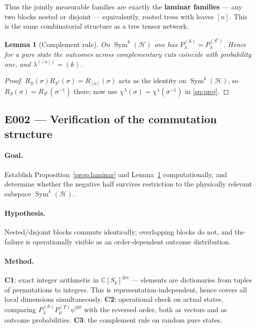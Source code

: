 \documentclass[11pt]{article}
\newtheorem{lemma}[theorem]{Lemma}
\theoremstyle{definition}
\theoremstyle{remark}
\newcommand{\Sym}{\operatorname{Sym}}
\newcommand{\Cx}{\mathbb{C}}
\newcommand{\Hil}{\mathcal{H}}
\begin{document}
Thus the jointly measurable families are exactly the \textbf{laminar families} --- any
two blocks nested or disjoint --- equivalently, rooted trees with leaves $[n]$. This is
the same combinatorial structure as a tree tensor network.

\begin{lemma}[Complement rule]
\label{lem:complement}
On $\Sym^k(\Hil)$ one has $P^{(S)}_\lambda = P^{(S^c)}_\lambda$. Hence for a pure state
the outcomes across complementary cuts coincide with probability one, and
$\lambda^{([n])} = (k)$.
\end{lemma}

\begin{proof}
$R_S(\sigma)R_{S^c}(\sigma) = R_{[n]}(\sigma)$ acts as the identity on $\Sym^k(\Hil)$,
so $R_S(\sigma) = R_{S^c}(\sigma^{-1})$ there; now use
$\chi^\lambda(\sigma) = \chi^\lambda(\sigma^{-1})$ in \eqref{eq:proj}.
\end{proof}

\subsection{E002 --- Verification of the commutation structure}

\paragraph{Goal.} Establish Proposition~\ref{prop:laminar} and Lemma~\ref{lem:complement}
computationally, and determine whether the negative half survives restriction to the
physically relevant subspace $\Sym^k(\Hil)$.

\paragraph{Hypothesis.} Nested/disjoint blocks commute identically; overlapping blocks
do not, and the failure is operationally visible as an order-dependent outcome
distribution.

\paragraph{Method.}
\textbf{C1}: exact integer arithmetic in $\Cx[S_k]^{\otimes n}$ --- elements are
dictionaries from tuples of permutations to integers. This is
representation-independent, hence covers all local dimensions simultaneously.
\textbf{C2}: operational check on actual states, comparing
$P^{(S)}_\lambda P^{(T)}_\mu \psi^{\otimes k}$ with the reversed order, both as vectors
and as outcome probabilities. \textbf{C3}: the complement rule on random pure states.
\end{document}
